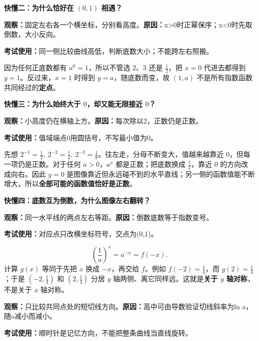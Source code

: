 \clearpage
\begin{explanationbox}
\textbf{\textcolor{CExplanation}{快懂二：为什么恰好在 $(0,1)$ 相遇？}}

\textbf{观察：}固定左右各一个横坐标，分别看高度。\quad\textbf{原因：}x>0时正幂保序；x<0时先取倒数，大小反向。

\textbf{考试使用：}同一侧比较曲线高低，判断底数大小；不能跨左右照搬。



因为任何正底数都有 $a^0=1$，所以不管选 $2$、$3$ 还是 $\frac12$，把 $x=0$ 代进去都得到 $y=1$。反过来，$x=1$ 时得到 $y=a$，随底数而变，故 $(1,a)$ 不是所有指数函数共同经过的\textbf{定点}。

\medskip

\end{explanationbox}
\clearpage
\begin{explanationbox}
\textbf{\textcolor{CExplanation}{快懂三：为什么始终大于 $0$，却又能无限接近 $0$？}}

\textbf{观察：}小高度仍在横轴上方。\quad\textbf{原因：}每次除以2，正数仍是正数。

\textbf{考试使用：}值域端点0用圆括号，不写最小值为0。



先想 $2^{-1}=\frac12,\ 2^{-2}=\frac14,\ 2^{-3}=\frac18$。往左走，分母不断变大，值越来越靠近 $0$，但每一项仍是正数。对于任何 $a>0$，$a^x$ 都是正数；把底数换成 $\frac12$，靠近 $0$ 的方向改成向右。因此 $y=0$ 是图像靠近但永远碰不到的水平直线；另一侧的函数值能不断增大，所以\textbf{全部可能的函数值恰好是正数}。

\medskip

\end{explanationbox}
\clearpage
\begin{explanationbox}
\textbf{\textcolor{CExplanation}{快懂四：底数互为倒数，为什么图像左右翻转？}}

\textbf{观察：}同一水平线的两点左右等距。\quad\textbf{原因：}倒数底数等于指数变号。

\textbf{考试使用：}对应点只改横坐标符号，交点为(0,1)。



\[
\left(\frac1a\right)^x=a^{-x}=f(-x).
\]
计算 $g(x)$ 等同于先把 $x$ 换成 $-x$，再交给 $f$。例如 $f(-2)=\frac14$，而 $g(2)=\frac14$；于是 $(-2,\frac14)$ 和 $(2,\frac14)$ 分居 $y$ 轴两侧、离它同样远。这就是\textbf{关于 $y$ 轴对称}，不是关于 $x$ 轴对称。

\medskip
\end{explanationbox}
\clearpage
\begin{explanationbox}


\textbf{观察：}只比较共同点处的短切线方向。\quad\textbf{原因：}高中可由导数验证切线斜率为ln a，随a减小而减小。

\textbf{考试使用：}顺时针是记忆方向，不能把整条曲线当直线旋转。

\end{explanationbox}
